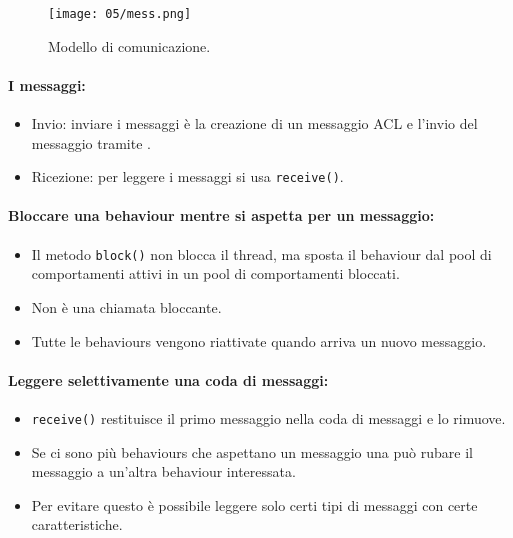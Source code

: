 
\begin{figure}[!h]
    \centering
    \texttt{[image: 05/mess.png]}
  \caption{Modello di comunicazione.}
\end{figure}

\paragraph{I messaggi:}

\begin{itemize}
  \item Invio: inviare i messaggi è la creazione di un messaggio ACL e l'invio del messaggio tramite .
  \item Ricezione: per leggere i messaggi si usa \texttt{receive()}.
\end{itemize}

\paragraph{Bloccare una behaviour mentre si aspetta per un messaggio:}

\begin{itemize}
  \item Il metodo \texttt{block()} non blocca il thread, ma sposta il behaviour dal pool di comportamenti attivi in un pool di comportamenti bloccati. 
  \item Non è una chiamata bloccante. 
  \item Tutte le behaviours vengono riattivate quando arriva un nuovo messaggio.
\end{itemize}

\paragraph{Leggere selettivamente una coda di messaggi:}

\begin{itemize}
  \item \texttt{receive()} restituisce il primo messaggio nella coda di messaggi e lo rimuove. 
  \item Se ci sono più behaviours che aspettano un messaggio una può rubare il messaggio a un'altra behaviour interessata. 
      \item Per evitare questo è possibile leggere solo certi tipi di messaggi con certe caratteristiche.
\end{itemize}

